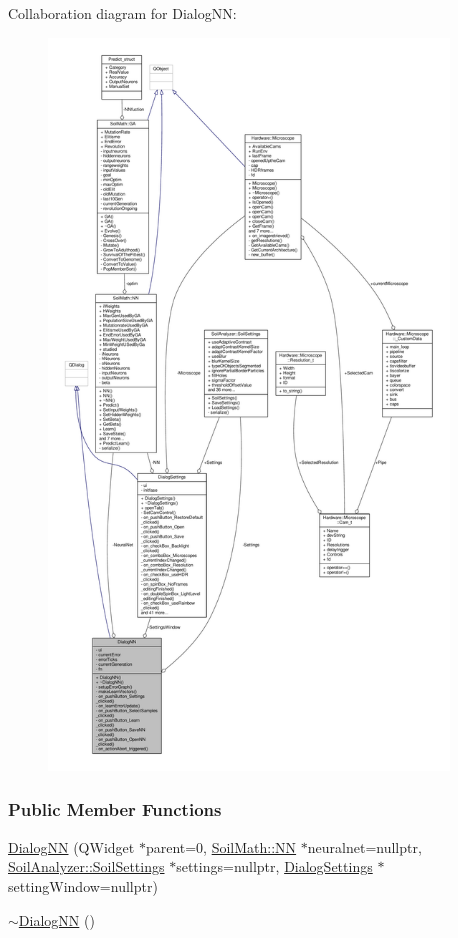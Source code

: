Collaboration diagram for Dialog\+N\+N\+:
\nopagebreak
\begin{figure}[H]
\begin{center}
\leavevmode
\includegraphics[height=550pt]{class_dialog_n_n__coll__graph}
\end{center}
\end{figure}
\subsubsection*{Public Member Functions}
\begin{DoxyCompactItemize}
\item 
\hyperlink{class_dialog_n_n_a53065cfe16eeaf3cf1b1e94058738c3f}{Dialog\+N\+N} (Q\+Widget $\ast$parent=0, \hyperlink{class_soil_math_1_1_n_n}{Soil\+Math\+::\+N\+N} $\ast$neuralnet=nullptr, \hyperlink{class_soil_analyzer_1_1_soil_settings}{Soil\+Analyzer\+::\+Soil\+Settings} $\ast$settings=nullptr, \hyperlink{class_dialog_settings}{Dialog\+Settings} $\ast$setting\+Window=nullptr)
\item 
\hyperlink{class_dialog_n_n_a128ab0c8ba3e7a140545eb2dd37f4aab}{$\sim$\+Dialog\+N\+N} ()
\end{DoxyCompactItemize}
